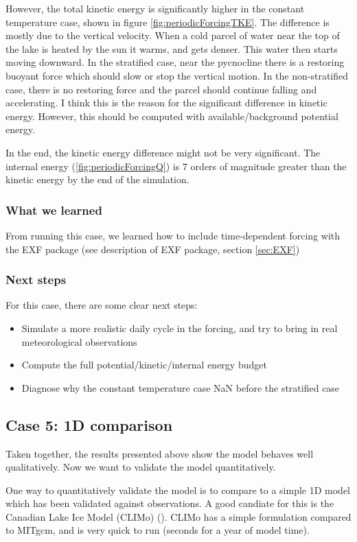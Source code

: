 \documentclass[11pt]{article}
\begin{document}
However, the total kinetic energy is significantly higher in the constant temperature case, shown in figure \ref{fig:periodicForcingTKE}. The difference is mostly due to the vertical velocity. When a cold parcel of water near the top of the lake is heated by the sun it warms, and gets denser. This water then starts moving downward. In the stratified case, near the pycnocline there is a restoring buoyant force which should slow or stop the vertical motion. In the non-stratified case, there is no restoring force and the parcel should continue falling and accelerating. I think this is the reason for the significant difference in kinetic energy. However, this should be computed with available/background potential energy.

In the end, the kinetic energy difference might not be very significant. The internal energy (\ref{fig:periodicForcingQ}) is 7 orders of magnitude greater than the kinetic energy by the end of the simulation.

\subsubsection{What we learned}
From running this case, we learned how to include time-dependent forcing with the EXF package (see description of EXF package, section \ref{sec:EXF})

\subsubsection{Next steps}
For this case, there are some clear next steps:
\begin{itemize}
\item{Simulate a more realistic daily cycle in the forcing, and try to bring in real meteorological observations}
\item{Compute the full potential/kinetic/internal energy budget}
\item{Diagnose why the constant temperature case NaN before the stratified case}
\end{itemize}

\subsection{Case 5: 1D comparison}
\label{sec:CLIMo}
Taken together, the results presented above show the model behaves well qualitatively. Now we want to validate the model quantitatively.

One way to quantitatively validate the model is to compare to a simple 1D model which has been validated against observations. A good candiate for this is the Canadian Lake Ice Model (CLIMo) (\cite{Duguay2003}). CLIMo has a simple formulation compared to MITgcm, and is very quick to run (seconds for a year of model time).
\end{document}
